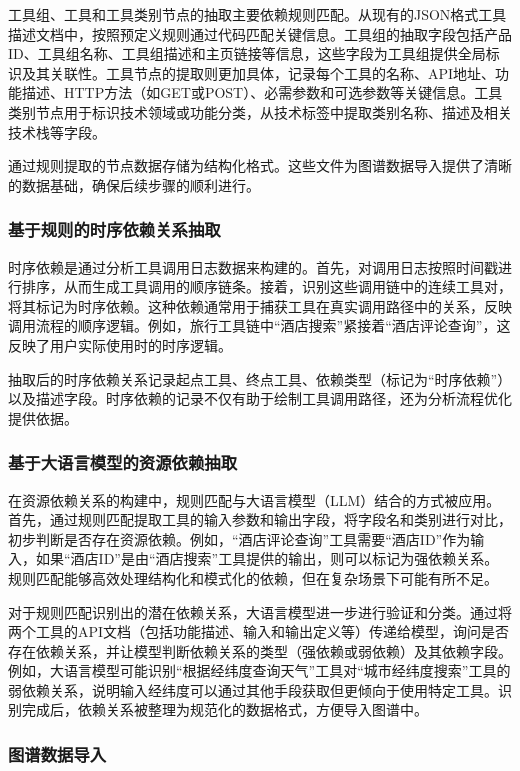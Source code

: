 工具组、工具和工具类别节点的抽取主要依赖规则匹配。从现有的JSON格式工具描述文档中，按照预定义规则通过代码匹配关键信息。工具组的抽取字段包括产品ID、工具组名称、工具组描述和主页链接等信息，这些字段为工具组提供全局标识及其关联性。工具节点的提取则更加具体，记录每个工具的名称、API地址、功能描述、HTTP方法（如GET或POST）、必需参数和可选参数等关键信息。工具类别节点用于标识技术领域或功能分类，从技术标签中提取类别名称、描述及相关技术栈等字段。

通过规则提取的节点数据存储为结构化格式。这些文件为图谱数据导入提供了清晰的数据基础，确保后续步骤的顺利进行。

\subsubsection{基于规则的时序依赖关系抽取}

时序依赖是通过分析工具调用日志数据来构建的。首先，对调用日志按照时间戳进行排序，从而生成工具调用的顺序链条。接着，识别这些调用链中的连续工具对，将其标记为时序依赖。这种依赖通常用于捕获工具在真实调用路径中的关系，反映调用流程的顺序逻辑。例如，旅行工具链中“酒店搜索”紧接着“酒店评论查询”，这反映了用户实际使用时的时序逻辑。

抽取后的时序依赖关系记录起点工具、终点工具、依赖类型（标记为“时序依赖”）以及描述字段。时序依赖的记录不仅有助于绘制工具调用路径，还为分析流程优化提供依据。

\subsubsection{基于大语言模型的资源依赖抽取}

在资源依赖关系的构建中，规则匹配与大语言模型（LLM）结合的方式被应用。首先，通过规则匹配提取工具的输入参数和输出字段，将字段名和类别进行对比，初步判断是否存在资源依赖。例如，“酒店评论查询”工具需要“酒店ID”作为输入，如果“酒店ID”是由“酒店搜索”工具提供的输出，则可以标记为强依赖关系。规则匹配能够高效处理结构化和模式化的依赖，但在复杂场景下可能有所不足。

对于规则匹配识别出的潜在依赖关系，大语言模型进一步进行验证和分类。通过将两个工具的API文档（包括功能描述、输入和输出定义等）传递给模型，询问是否存在依赖关系，并让模型判断依赖关系的类型（强依赖或弱依赖）及其依赖字段。例如，大语言模型可能识别“根据经纬度查询天气”工具对“城市经纬度搜索”工具的弱依赖关系，说明输入经纬度可以通过其他手段获取但更倾向于使用特定工具。识别完成后，依赖关系被整理为规范化的数据格式，方便导入图谱中。

\subsubsection{图谱数据导入}

